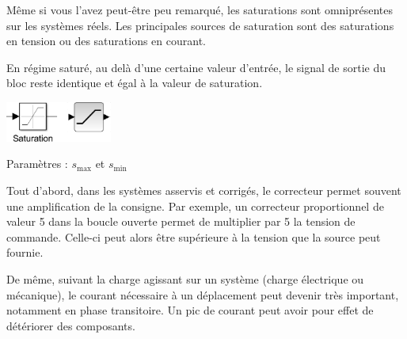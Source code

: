 \documentclass[10pt,fleqn]{article} %
\begin{document}
\noindent \begin{minipage}[c]{.54\linewidth}
\indent Même si vous l'avez peut-être peu remarqué, les saturations sont omniprésentes sur les systèmes réels. Les principales sources de saturation sont des saturations en tension ou des saturations en courant. 

En régime saturé, au delà d'une certaine valeur d'entrée, le signal de sortie du bloc reste identique et égal à la valeur de saturation.

\end{minipage}
\hfill
\begin{minipage}[c]{.18\linewidth}
\begin{center}
\includegraphics[width=3.5cm]{images/sat}

Paramètres : $s_{\text{max}}$ et $s_{\text{min}}$
\end{center}
\end{minipage}
\hfill
\begin{minipage}[c]{.22\linewidth}
\begin{center}
\end{center}
\end{minipage}

\vspace{.2cm}

Tout d'abord, dans les systèmes asservis et corrigés, le correcteur permet souvent une amplification de la consigne. Par exemple, un correcteur proportionnel de valeur 5 dans la boucle ouverte permet de multiplier par 5 la tension de commande. Celle-ci peut alors être supérieure à la tension que la source peut fournie.

De même, suivant la charge agissant sur un système (charge électrique ou mécanique), le courant nécessaire à un déplacement peut devenir très important, notamment en phase transitoire. Un pic de courant peut avoir pour effet de détériorer des composants.
\end{document}
